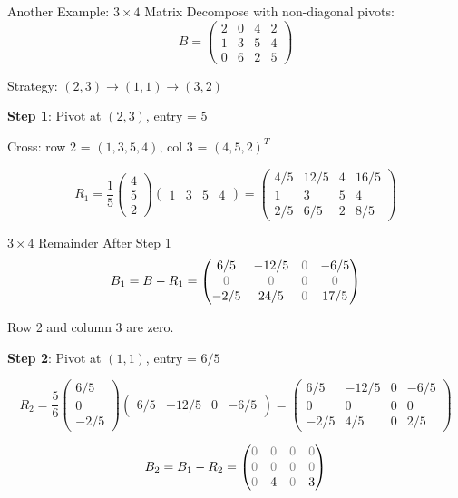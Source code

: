 \documentclass[10pt]{beamer}
\theoremstyle{definition}
\newcommand{\rem}[1]{{\color{gray}#1}}                %
\begin{document}
\begin{frame}{Another Example: $3 \times 4$ Matrix}
Decompose with non-diagonal pivots:
$$B = \begin{pmatrix}
2 & 0 & 4 & 2 \\
1 & 3 & 5 & 4 \\
0 & 6 & 2 & 5
\end{pmatrix}$$

\vfill
Strategy: $(2,3) \to (1,1) \to (3,2)$

\vfill
\textbf{Step 1}: Pivot at $(2,3)$, entry = $5$

Cross: row 2 = $(1, 3, 5, 4)$, col 3 = $(4, 5, 2)^T$

$$R_1 = \frac{1}{5} \begin{pmatrix} 4 \\ 5 \\ 2 \end{pmatrix}
\begin{pmatrix} 1 & 3 & 5 & 4 \end{pmatrix}
= \begin{pmatrix}
4/5 & 12/5 & 4 & 16/5 \\
1 & 3 & 5 & 4 \\
2/5 & 6/5 & 2 & 8/5
\end{pmatrix}$$
\end{frame}

\begin{frame}{$3 \times 4$ Remainder After Step 1}
$$B_1 = B - R_1 = \begin{pmatrix}
6/5 & -12/5 & \rem{0} & -6/5 \\
\rem{0} & \rem{0} & \rem{0} & \rem{0} \\
-2/5 & 24/5 & \rem{0} & 17/5
\end{pmatrix}$$

Row 2 and column 3 are \rem{zero}.

\vfill
\textbf{Step 2}: Pivot at $(1,1)$, entry = $6/5$

$$R_2 = \frac{5}{6} \begin{pmatrix} 6/5 \\ 0 \\ -2/5 \end{pmatrix}
\begin{pmatrix} 6/5 & -12/5 & 0 & -6/5 \end{pmatrix}
= \begin{pmatrix}
6/5 & -12/5 & 0 & -6/5 \\
0 & 0 & 0 & 0 \\
-2/5 & 4/5 & 0 & 2/5
\end{pmatrix}$$

\vfill
$$B_2 = B_1 - R_2 = \begin{pmatrix}
\rem{0} & \rem{0} & \rem{0} & \rem{0} \\
\rem{0} & \rem{0} & \rem{0} & \rem{0} \\
\rem{0} & 4 & \rem{0} & 3
\end{pmatrix}$$
\end{frame}
\end{document}
